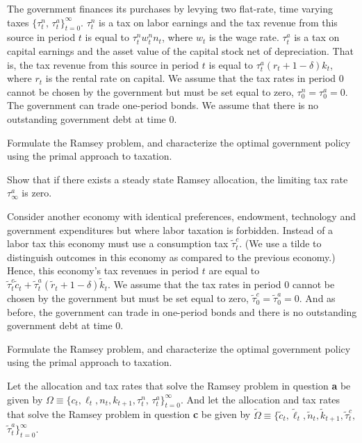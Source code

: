 The government finances its purchases by levying
two flat-rate, time varying taxes $\{\tau^n_t, \,\tau^a_t\}_{t=0}^\infty$.
$\tau^n_t$ is a tax on labor earnings and the tax revenue from
this source in period $t$ is equal to $\tau^n_t w^n_t n_t$, where $w_t$ is
the wage rate. $\tau^a_t$ is
a tax on capital earnings and the asset value of the capital stock net of
depreciation. That is, the tax revenue from this source in period
$t$ is equal to $\tau^a_t (r_t + 1-\delta) k_t$, where $r_t$ is the rental
rate on capital. We assume that the tax rates in period $0$ cannot be
chosen by the government but must be set equal to zero,
$\tau^n_0 = \tau^a_0 = 0$.
The government can trade  one-period bonds. We assume that
there is no outstanding government debt at time $0$.

\medskip
{} Formulate the Ramsey problem, and characterize the optimal
government policy using the primal approach to taxation.

\medskip
{} Show that if there exists a steady state Ramsey
allocation, the limiting tax rate $\tau^a_\infty$ is zero.

\medskip
\noindent
Consider another economy with identical preferences, endowment,
technology and government expenditures but where labor taxation is
forbidden. Instead of a labor tax this economy must
use a consumption tax $\tilde \tau^c_t$. (We use a tilde
to distinguish outcomes in this economy as compared to the previous
economy.) Hence, this economy's tax revenues in period $t$
are equal to $\tilde \tau^c_t \tilde c_t
+ \tilde \tau^a_t (\tilde r_t + 1-\delta) \tilde k_t$.
We assume that the tax rates in period $0$ cannot be
chosen by the government but must be set equal to zero,
$\tilde \tau^c_0 = \tilde \tau^a_0 = 0$. And as before,
the government can trade in one-period bonds and there
is no outstanding government debt at time $0$.

\medskip
{} Formulate the Ramsey problem, and characterize the optimal
government policy using the primal approach to taxation.
\medskip

\noindent
Let the allocation and tax rates that solve the Ramsey problem
in question {\bf a}
be given by $\Omega \equiv \{c_t, \ell_t, n_t, k_{t+1},
\tau^n_t, \,\tau^a_t\}_{t=0}^\infty$. And let the allocation
and tax rates that solve the Ramsey problem in question {\bf c}
be given by  $\tilde \Omega \equiv
\{\tilde c_t, \tilde \ell_t, \tilde n_t,
\tilde k_{t+1},\tilde \tau^c_t,$ $\tilde \tau^a_t\}_{t=0}^\infty$.

